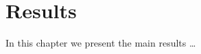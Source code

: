 \documentclass[12pt, class=report, crop=false]{standalone}
\begin{document}
\chapter{Results}%
\label{chap:results}

In this chapter we present the main results \dots
\end{document}
